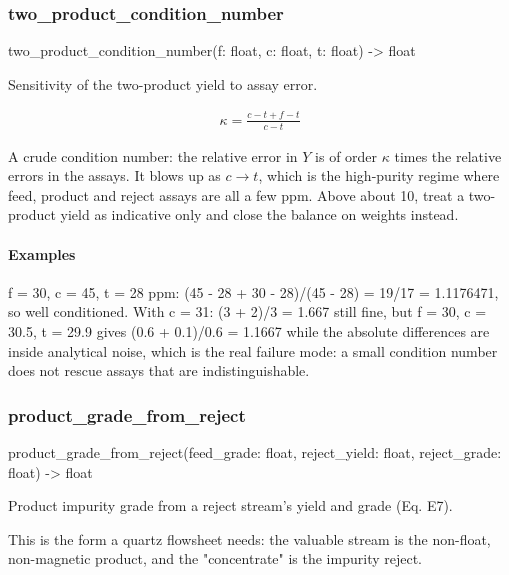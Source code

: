 \documentclass[10pt,a4paper,twoside]{report}
\begin{document}
\subsubsection*{two\_product\_condition\_number}

\begin{verbatimsmall}
two_product_condition_number(f: float, c: float, t: float) -> float
\end{verbatimsmall}

Sensitivity of the two-product yield to assay error.

\begin{equation*}
\begin{gathered}
\kappa = \frac{c - t + f - t}{c - t}
\end{gathered}
\end{equation*}

A crude condition number: the relative error in $Y$ is of order $\kappa$ times the relative errors in the assays. It blows up as $c \to t$, which is the high-purity regime where feed, product and reject assays are all a few ppm. Above about 10, treat a two-product yield as indicative only and close the balance on weights instead.

\paragraph*{Examples}

f = 30, c = 45, t = 28 ppm: (45 - 28 + 30 - 28)/(45 - 28) = 19/17 = 1.1176471, so well conditioned. With c = 31: (3 + 2)/3 = 1.667 still fine, but f = 30, c = 30.5, t = 29.9 gives (0.6 + 0.1)/0.6 = 1.1667 while the absolute differences are inside analytical noise, which is the real failure mode: a small condition number does not rescue assays that are indistinguishable.

\subsubsection*{product\_grade\_from\_reject}

\begin{verbatimsmall}
product_grade_from_reject(feed_grade: float, reject_yield: float, reject_grade: float) -> float
\end{verbatimsmall}

Product impurity grade from a reject stream's yield and grade (Eq. E7).

This is the form a quartz flowsheet needs: the valuable stream is the non-float, non-magnetic product, and the "concentrate" is the impurity reject.
\end{document}
